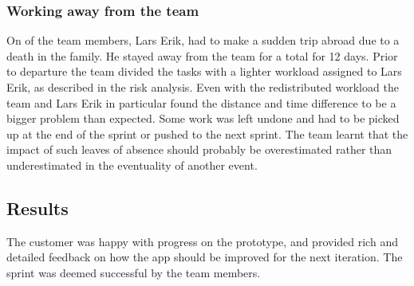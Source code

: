 \subsubsection{Working away from the team}
On of the team members, Lars Erik, had to make a sudden trip abroad due to a death in the family. He stayed away from the team for a total for 12 days. Prior to departure the team divided the tasks with a lighter workload assigned to Lars Erik, as described in the risk analysis. Even with the redistributed workload the team and Lars Erik in particular found the distance and time difference to be a bigger problem than expected. Some work was left undone and had to be picked up at the end of the sprint or pushed to the next sprint. The team learnt that the impact of such leaves of absence should probably be overestimated rather than underestimated in the eventuality of another event.

\subsection{Results}
The customer was happy with progress on the prototype, and provided rich and detailed feedback on how the app should be improved for the next iteration. The sprint was deemed successful by the team members.